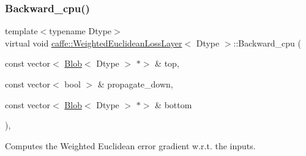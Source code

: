 \subsubsection{\texorpdfstring{Backward\+\_\+cpu()}{Backward\_cpu()}\hspace{0.1cm}{\footnotesize\ttfamily [2/2]}}
{\footnotesize\ttfamily template$<$typename Dtype$>$ \\
virtual void \mbox{\hyperlink{classcaffe_1_1_weighted_euclidean_loss_layer}{caffe\+::\+Weighted\+Euclidean\+Loss\+Layer}}$<$ Dtype $>$\+::Backward\+\_\+cpu (\begin{DoxyParamCaption}\item[{const vector$<$ \mbox{\hyperlink{classcaffe_1_1_blob}{Blob}}$<$ Dtype $>$ $\ast$$>$ \&}]{top,  }\item[{const vector$<$ bool $>$ \&}]{propagate\+\_\+down,  }\item[{const vector$<$ \mbox{\hyperlink{classcaffe_1_1_blob}{Blob}}$<$ Dtype $>$ $\ast$$>$ \&}]{bottom }\end{DoxyParamCaption})\hspace{0.3cm}{\ttfamily [protected]}, {\ttfamily [virtual]}}



Computes the Weighted Euclidean error gradient w.\+r.\+t. the inputs. 


